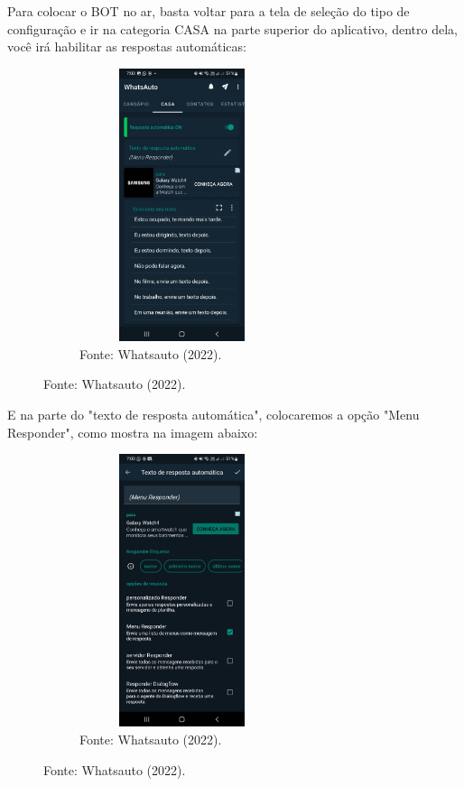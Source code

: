 \begin{itemize}
        Para colocar o BOT no ar, basta voltar para a tela de seleção do tipo de configuração e ir na categoria CASA na parte superior do aplicativo, dentro dela, você irá habilitar as respostas automáticas: \newpage

\begin{figure}[!htb]
\centering
\captionsetup[subfigure]{labelformat=empty}
\caption{``Menu Ligar 1''}
\begin{subfigure}{.5\textwidth}
\centering
\includegraphics[width=6cm,height=8cm]{Partes/Imagens/Menu ligar 1.jpeg}
\caption{Fonte: Whatsauto (2022).}
\end{subfigure}%
\end{figure}

         E na parte do "texto de resposta automática", colocaremos a opção "Menu Responder", como mostra na imagem abaixo:

\begin{figure}[!htb]
\centering
\captionsetup[subfigure]{labelformat=empty}
\caption{``Menu Ligar 2''}
\begin{subfigure}{.5\textwidth}
\centering
\includegraphics[width=6cm,height=8cm]{Partes/Imagens/Menu Ligar 2.jpeg}
\caption{Fonte: Whatsauto (2022).}
\end{subfigure}%
\end{figure}
\newpage
  

\end{itemize}

